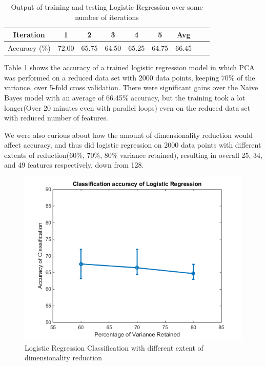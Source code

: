 \documentclass{article} %
\begin{document}
\begin{table}[h]
\centering
\begin{tabular}{|c|c|c|c|c|c|c|c|c|}
\hline
Iteration & 1 & 2 & 3 & 4 & 5 & Avg \\
\hline
Accuracy (\%) & 72.00 & 65.75 & 64.50 & 65.25 & 64.75 & 66.45 \\
\hline
\end{tabular}
\caption{Output of training and testing Logistic Regression over some number of iterations}
\label{tab:mid-logr-results}
\end{table}

Table \ref{tab:mid-logr-results} shows the accuracy of a trained logistic regression model in which PCA was performed on a reduced data set with 2000 data points, keeping 70\% of the variance, over 5-fold cross validation. There were significant gains over the Naive Bayes model with an average of 66.45\% accuracy, but the training took a lot longer(Over 20 minutes even with parallel loops) even on the reduced data set with reduced number of features.

We were also curious about how the amount of dimensionality reduction would affect accuracy, and thus did logistic regression on 2000 data points with different extents of reduction(60\%, 70\%, 80\% variance retained), resulting in overall 25, 34, and 49 features respectively, down from 128.

\begin{figure}[h]
\begin{center}
\includegraphics[scale=0.4]{lr_acc.png}
\end{center}
\caption{Logistic Regression Classification with different extent of dimensionality reduction}
\label{fig:lr-dim-red}
\end{figure}
\end{document}
